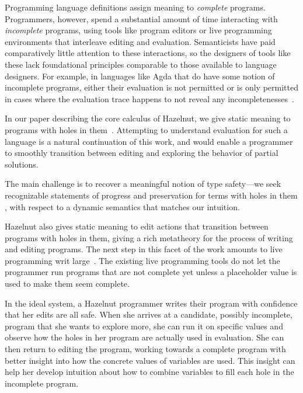 Programming language definitions assign meaning to \textit{complete}
programs. Programmers, however, spend a substantial amount of time
interacting with \textit{incomplete} programs, using tools like program
editors or live programming environments that interleave editing and
evaluation. Semanticists have paid comparatively little attention to these
interactions, so the designers of tools like these lack foundational
principles comparable to those available to language designers. For
example, in languages like Agda that do have some notion of incomplete
programs, either their evaluation is not permitted or is only permitted in
cases where the evaluation trace happens to not reveal any
incompletenesses~\cite{norell:thesis}.

In our paper describing the core calculus of Hazelnut, we give static
meaning to programs with holes in them~\cite{hazelnut:popl}.  Attempting to
understand evaluation for such a language is a natural continuation of this
work, and would enable a programmer to smoothly transition between editing
and exploring the behavior of partial solutions.

The main challenge is to recover a meaningful notion of type safety---we
seek recognizable statements of progress and preservation for terms with
holes in them , with respect to a dynamic
semantics that matches our intuition.

Hazelnut also gives static meaning to edit actions that transition between
programs with holes in them, giving a rich metatheory for the process of
writing and editing programs. The next step in this facet of the work
amounts to live programming writ large~\cite{burckhardt2013s}. The existing
live programming tools do not let the programmer run programs that are not
complete yet unless a placeholder value is used to make them seem complete.

In the ideal system, a Hazelnut programmer writes their program with
confidence that her edits are all safe. When she arrives at a candidate,
possibly incomplete, program that she wants to explore more, she can run it
on specific values and observe how the holes in her program are actually
used in evaluation. She can then return to editing the program, working
towards a complete program with better insight into how the concrete values
of variables are used. This insight can help her develop intuition about
how to combine variables to fill each hole in the incomplete program.
